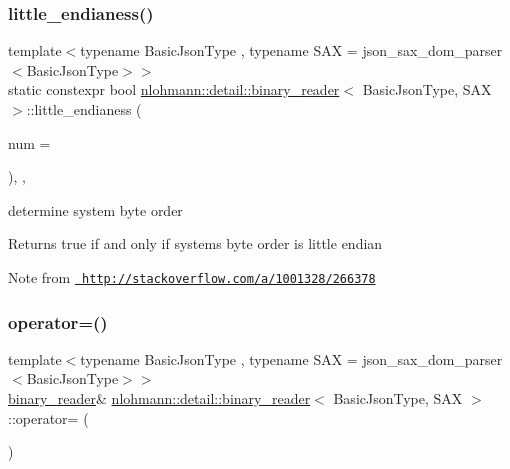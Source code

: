 \subsubsection{\texorpdfstring{little\_endianess()}{little\_endianess()}}
{\footnotesize\ttfamily template$<$typename Basic\+Json\+Type , typename S\+AX  = json\+\_\+sax\+\_\+dom\+\_\+parser$<$\+Basic\+Json\+Type$>$$>$ \\
static constexpr bool \mbox{\hyperlink{classnlohmann_1_1detail_1_1binary__reader}{nlohmann\+::detail\+::binary\+\_\+reader}}$<$ Basic\+Json\+Type, S\+AX $>$\+::little\+\_\+endianess (\begin{DoxyParamCaption}\item[{int}]{num = {} }\end{DoxyParamCaption})\hspace{0.3cm}{\ttfamily [inline]}, {\ttfamily [static]}, {\ttfamily [noexcept]}}



determine system byte order 

\begin{DoxyReturn}{Returns}
true if and only if system\textquotesingle{}s byte order is little endian
\end{DoxyReturn}
\begin{DoxyNote}{Note}
from \href{http://stackoverflow.com/a/1001328/266378}{\texttt{ http\+://stackoverflow.\+com/a/1001328/266378}} 
\end{DoxyNote}
\mbox{\label{classnlohmann_1_1detail_1_1binary__reader_a87826b833ee7fec146c97233bb0f6ab8}} 
\subsubsection{\texorpdfstring{operator=()}{operator=()}\hspace{0.1cm}{\footnotesize\ttfamily [1/2]}}
{\footnotesize\ttfamily template$<$typename Basic\+Json\+Type , typename S\+AX  = json\+\_\+sax\+\_\+dom\+\_\+parser$<$\+Basic\+Json\+Type$>$$>$ \\
\mbox{\hyperlink{classnlohmann_1_1detail_1_1binary__reader}{binary\+\_\+reader}}\& \mbox{\hyperlink{classnlohmann_1_1detail_1_1binary__reader}{nlohmann\+::detail\+::binary\+\_\+reader}}$<$ Basic\+Json\+Type, S\+AX $>$\+::operator= (\begin{DoxyParamCaption}\item[{const \mbox{\hyperlink{classnlohmann_1_1detail_1_1binary__reader}{binary\+\_\+reader}}$<$ Basic\+Json\+Type, S\+AX $>$ \&}]{ }\end{DoxyParamCaption})\hspace{0.3cm}{\ttfamily [delete]}}

